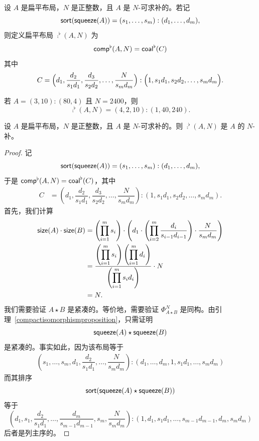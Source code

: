\begin{construction}\label{Ncomplementconstruction}
    设 $A$ 是扁平布局，$N$ 是正整数，且 $A$ 是 $N$-可求补的。若记
    \[\mathsf{sort}(\mathsf{squeeze}(A)) = (s_1,\dots,s_m):(d_1,\dots,d_m),\]
    则定义扁平布局 $\comp^\flat(A,N)$ 为
    \[
    \mathsf{comp}^\flat(A,N) = \mathsf{coal}^\flat(C)
    \]
    其中
    \[C = \Bigl(d_1 , \dfrac{d_2}{s_1d_1} , \dfrac{d_3}{s_2d_2} , \dots ,\dfrac{N}{s_md_m} \Bigr) : \Bigl(1 , s_1d_1 , s_2d_2, \dots ,s_md_m \Bigr).
    \]
\end{construction}

\begin{example}
若 $A = (3,10):(80,4)$ 且 $N = 2400$，则
\[
\comp^\flat(A,N) = (4,2,10):(1,40,240).
\]
\end{example}



\begin{lemma}\label{Ncomplementsarecomplements}
    设 $A$ 是扁平布局，$N$ 是正整数，且 $A$ 是 $N$-可求补的。则 $\comp^\flat(A,N)$ 是 $A$ 的 $N$-补。
\end{lemma}

\begin{proof}
    记
    \[\mathsf{sort}(\mathsf{squeeze}(A)) = (s_1,\dots,s_m):(d_1,\dots,d_m),\]
    于是 $\mathsf{comp}^\flat(A,N) = \mathsf{coal}^\flat(C)$，其中
    \begin{align*}
    C
    & = \left(d_1 , \dfrac{d_2}{s_1d_1} , \dfrac{d_3}{s_2d_2} , \dots ,\dfrac{N}{s_md_m} \right) : \left(1 , s_1d_1 , s_2d_2, \dots ,s_md_m \right).
    \end{align*}
    首先，我们计算
    \begin{align*}
    \mathsf{size}(A) \cdot \mathsf{size}(B) & = \left(\prod_{i=1}^m s_i \right) \cdot \left( d_1 \cdot \left(\prod_{i=2}^m \dfrac{d_i}{s_{i-1}d_{i-1}}\right) \cdot \dfrac{N}{s_md_m} \right)\\
    & = \dfrac{\left(\displaystyle\prod_{i=1}^m s_i\right)\left(\displaystyle\prod_{i=1}^m d_i \right)}{\left(\displaystyle\prod_{i=1}^m s_id_i \right)} \cdot N \\
    & = N.
    \end{align*}
    我们需要验证 $A \star B$ 是紧凑的。等价地，需要验证 $\Phi_{A \star B}^N$ 是同构。由引理~\ref{compactisomorphismproposition}，只需证明
    \[\mathsf{squeeze}(A)\star \mathsf{squeeze}(B)\]
    是紧凑的。事实如此，因为该布局等于
    \begin{align*}
    \left(s_1,\dots,s_m,d_1,\dfrac{d_2}{s_1d_1},\dots,\dfrac{N}{s_md_m}\right):(d_1,\dots,d_m,1,s_1d_1,\dots, s_md_m)
    \end{align*}
    而其排序
    \[\mathsf{sort}(\mathsf{squeeze}(A)\star \mathsf{squeeze}(B))\] 等于
    \[
    \left(d_1,s_1, \dfrac{d_2}{s_1d_1},\dots, \dfrac{d_m}{s_{m-1}{d_{m-1}}}, s_m , \dfrac{N}{s_md_m}\right):(1,d_1,s_1d_1, \dots ,s_{m-1}d_{m-1}, d_m,s_md_m)
    \]
    后者是列主序的。
\end{proof}


